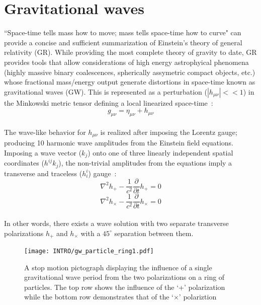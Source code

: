 


\section{Gravitational waves}
``Space-time tells mass how to move; mass tells space-time how to curve" can provide a concise and sufficient summarization of Einstein's theory of general relativity (GR). While providing the most complete theory of gravity to date, GR provides tools that allow considerations of high energy astrophyical phenomena (highly massive binary coalescences, spherically assymetric compact objects, etc.) whose fractional mass/energy output generate distortions in space-time known as gravitational waves (GW).
This is represented as a perturbation ($|h_{\mu \nu}|<<1$) in the Minkowski metric tensor defining a local linearized space-time~\cite{einstein:1918}:
\\
$$g_{\mu \nu} = \eta_{\mu \nu} + h_{\mu \nu}$$
\\
The wave-like behavior for $h_{\mu \nu}$ is realized after imposing the Lorentz gauge; producing 10 harmonic wave amplitudes from the Einstein field equations. Imposing a wave vector ($k_j$) onto one of three linearly independent spatial coordinates ($h^{ij}k_j$), the non-trivial amplitudes from the equations imply a transverse and traceless ($h^{i}_{i}$) gauge~\cite{misner:1973}:
\\
$$\nabla^2 h_{+} - \frac{1}{c^2} \frac{\partial}{\partial t} h_{+} = 0$$
$$\nabla^2 h_{\times} - \frac{1}{c^2} \frac{\partial}{\partial t} h_{\times} = 0$$
\\
In other words, there exists a wave solution with two separate transverse polarizations $h_{+}$ and $h_{\times}$ with a $45^{\circ}$ separation between them. 

\begin{figure}[H]
	\texttt{[image: INTRO/gw\_particle\_ring1.pdf]}
	\caption{A stop motion pictograph displaying the influence of a single gravitational wave period from the two polarizations on a ring of particles. The top row shows the influence of the `+' polarization while the bottom row demonstrates that of the `$\times$' polariztion}	
	\label{fig:gwpolarizations}
\end{figure}

